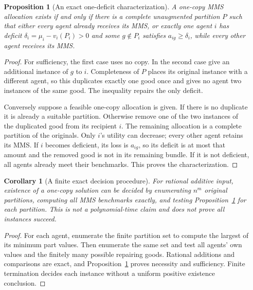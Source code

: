 \documentclass[11pt,a4paper]{article}
\newtheorem{proposition}[theorem]{Proposition}
\newtheorem{corollary}[theorem]{Corollary}
\theoremstyle{remark}\newtheorem{remark}[theorem]{Remark}
\begin{document}
\begin{proposition}[An exact one-deficit characterization]\label{prop:oneDeficit}
A one-copy MMS allocation exists if and only if there is a complete unaugmented partition $P$ such that either every agent already receives its MMS, or exactly one agent $i$ has deficit $\delta_i=\mu_i-v_i(P_i)>0$ and some $g\notin P_i$ satisfies $a_{ig}\ge\delta_i$, while every other agent receives its MMS.
\end{proposition}
\begin{proof}
For sufficiency, the first case uses no copy. In the second case give an additional instance of $g$ to $i$. Completeness of $P$ places its original instance with a different agent, so this duplicates exactly one good once and gives no agent two instances of the same good. The inequality repairs the only deficit.

Conversely suppose a feasible one-copy allocation is given. If there is no duplicate it is already a suitable partition. Otherwise remove one of the two instances of the duplicated good from its recipient $i$. The remaining allocation is a complete partition of the originals. Only $i$'s utility can decrease; every other agent retains its MMS. If $i$ becomes deficient, its loss is $a_{ig}$, so its deficit is at most that amount and the removed good is not in its remaining bundle. If it is not deficient, all agents already meet their benchmarks. This proves the characterization.
\end{proof}

\begin{corollary}[A finite exact decision procedure]
For rational additive input, existence of a one-copy solution can be decided by enumerating $n^m$ original partitions, computing all MMS benchmarks exactly, and testing Proposition~\ref{prop:oneDeficit} for each partition. This is not a polynomial-time claim and does not prove all instances succeed.
\end{corollary}
\begin{proof}
For each agent, enumerate the finite partition set to compute the largest of its minimum part values. Then enumerate the same set and test all agents' own values and the finitely many possible repairing goods. Rational additions and comparisons are exact, and Proposition~\ref{prop:oneDeficit} proves necessity and sufficiency. Finite termination decides each instance without a uniform positive existence conclusion.
\end{proof}
\end{document}

